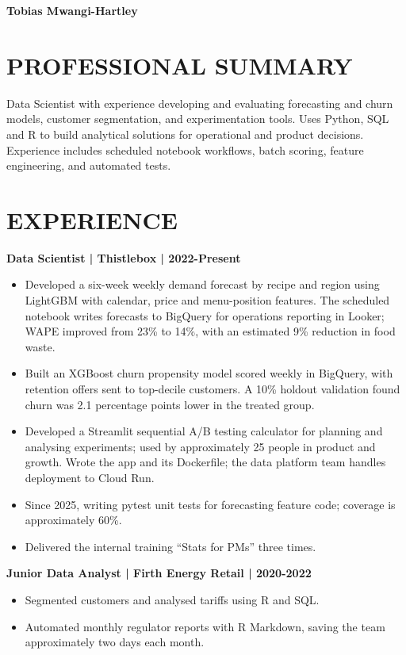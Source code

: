 \documentclass[11pt,a4paper]{article}
\begin{document}
\begin{center}
{\Huge\bfseries\color{primarycolor} Tobias Mwangi-Hartley}
\end{center}

\section*{PROFESSIONAL SUMMARY}
Data Scientist with experience developing and evaluating forecasting and churn models, customer segmentation, and experimentation tools. Uses Python, SQL and R to build analytical solutions for operational and product decisions. Experience includes scheduled notebook workflows, batch scoring, feature engineering, and automated tests.

\section*{EXPERIENCE}
\textbf{Data Scientist | Thistlebox | 2022-Present}
\begin{itemize}
\item Developed a six-week weekly demand forecast by recipe and region using LightGBM with calendar, price and menu-position features. The scheduled notebook writes forecasts to BigQuery for operations reporting in Looker; WAPE improved from 23\% to 14\%, with an estimated 9\% reduction in food waste.
\item Built an XGBoost churn propensity model scored weekly in BigQuery, with retention offers sent to top-decile customers. A 10\% holdout validation found churn was 2.1 percentage points lower in the treated group.
\item Developed a Streamlit sequential A/B testing calculator for planning and analysing experiments; used by approximately 25 people in product and growth. Wrote the app and its Dockerfile; the data platform team handles deployment to Cloud Run.
\item Since 2025, writing pytest unit tests for forecasting feature code; coverage is approximately 60\%.
\item Delivered the internal training ``Stats for PMs'' three times.
\end{itemize}

\textbf{Junior Data Analyst | Firth Energy Retail | 2020-2022}
\begin{itemize}
\item Segmented customers and analysed tariffs using R and SQL.
\item Automated monthly regulator reports with R Markdown, saving the team approximately two days each month.
\end{itemize}
\end{document}
